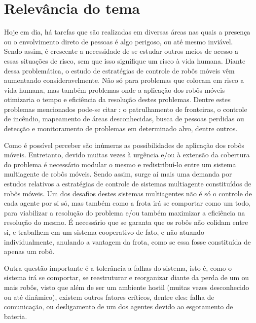 \section{Relevância do tema}
\label{sec:relevancia}

Hoje em dia, há tarefas que são realizadas em diversas áreas nas quais a presença ou o envolvimento direto de pessoas é algo perigoso, ou até mesmo inviável. Sendo assim, é crescente a necessidade de se estudar outros meios de acesso a essas situações de risco, sem que isso signifique um risco à vida humana. Diante dessa problemática, o estudo de estratégias de controle de robôs móveis vêm aumentando consideravelmente. Não só para problemas que colocam em risco a vida humana, mas também problemas onde a aplicação dos robôs móveis otimizaria o tempo e eficiência da resolução destes problemas. Dentre estes problemas mencionados pode-se citar \cite{GARHAS04,JTA13,MANJ09}: o patrulhamento de fronteiras, o controle de incêndio, mapeamento de áreas desconhecidas, busca de pessoas perdidas ou detecção e monitoramento de problemas em determinado alvo, dentre outros. 

Como é possível perceber são inúmeras as possibilidades de aplicação dos robôs móveis. Entretanto, devido muitas vezes à urgência e/ou à extensão da cobertura do problema é necessário modular o mesmo e redistribuí-lo entre um sistema multiagente de robôs móveis. Sendo assim, surge aí mais uma demanda por estudos relativos a estratégias de controle de sistemas multiagente constituídos de robôs móveis. 
Um dos desafios destes sistemas multiagentes não é só o controle de cada agente por si só, mas também como a frota irá se comportar como um todo, para viabilizar a resolução do problema e/ou também maximizar a eficiência na resolução do mesmo. É necessário que se garanta que os robôs não colidam entre si, e trabalhem em um sistema cooperativo de fato, e não atuando individualmente, %
anulando a vantagem da frota, como se essa fosse constituída de apenas um robô. 

Outra questão importante é a tolerância a falhas do sistema, isto é, como o sistema irá se comportar, se reestruturar e reorganizar diante da perda de um ou mais robôs, visto que além de ser um ambiente hostil (muitas vezes desconhecido ou até dinâmico), existem outros fatores críticos, dentre eles: falha de comunicação, ou desligamento de um dos agentes devido ao esgotamento de bateria.

